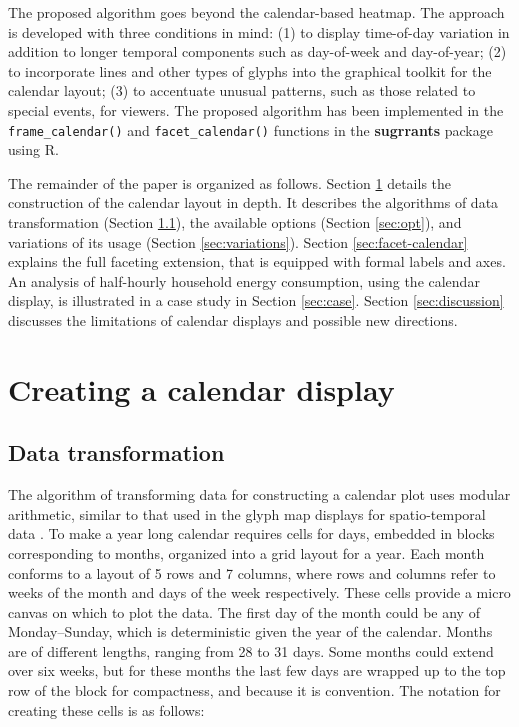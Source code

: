 \documentclass[12pt]{article}
\begin{document}
The proposed algorithm goes beyond the calendar-based heatmap. The approach is developed with three conditions in mind: (1) to display time-of-day variation in addition to longer temporal components such as day-of-week and day-of-year; (2) to incorporate lines and other types of glyphs into the graphical toolkit for the calendar layout; (3) to accentuate unusual patterns, such as those related to special events, for viewers. The proposed algorithm has been implemented in the \texttt{frame\_calendar()} and \texttt{facet\_calendar()} functions in the \textbf{sugrrants} package using R.

The remainder of the paper is organized as follows. Section \ref{sec:algorithm} details the construction of the calendar layout in depth. It describes the algorithms of data transformation (Section \ref{sec:transformation}), the available options (Section \ref{sec:opt}), and variations of its usage (Section \ref{sec:variations}). Section \ref{sec:facet-calendar} explains the full faceting extension, that is equipped with formal labels and axes. An analysis of half-hourly household energy consumption, using the calendar display, is illustrated in a case study in Section \ref{sec:case}. Section \ref{sec:discussion} discusses the limitations of calendar displays and possible new directions.

\hypertarget{sec:algorithm}{%
\section{Creating a calendar display}\label{sec:algorithm}}

\hypertarget{sec:transformation}{%
\subsection{Data transformation}\label{sec:transformation}}

The algorithm of transforming data for constructing a calendar plot uses modular arithmetic, similar to that used in the glyph map displays for spatio-temporal data \citep{Wickham2012glyph}. To make a year long calendar requires cells for days, embedded in blocks corresponding to months, organized into a grid layout for a year. Each month conforms to a layout of 5 rows and 7 columns, where rows and columns refer to weeks of the month and days of the week respectively. These cells provide a micro canvas on which to plot the data. The first day of the month could be any of Monday--Sunday, which is deterministic given the year of the calendar. Months are of different lengths, ranging from 28 to 31 days. Some months could extend over six weeks, but for these months the last few days are wrapped up to the top row of the block for compactness, and because it is convention. The notation for creating these cells is as follows:
\end{document}

